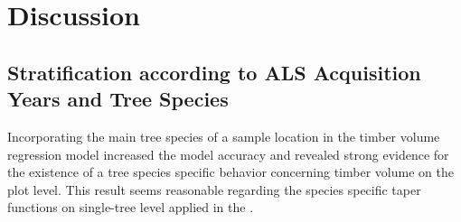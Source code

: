 \section{Discussion}
\label{sec:Dis}

\subsection{Stratification according to ALS Acquisition Years and Tree Species}
\label{sec:strat_dis}

Incorporating the main tree species of a sample location in the timber volume regression model increased the model accuracy and revealed strong evidence for the existence of a tree species specific behavior concerning timber volume on the plot level. This result seems reasonable regarding the species specific taper functions on single-tree level applied in the \bwi{} \citep{kublin2003, kublin2013}. \added{
}
